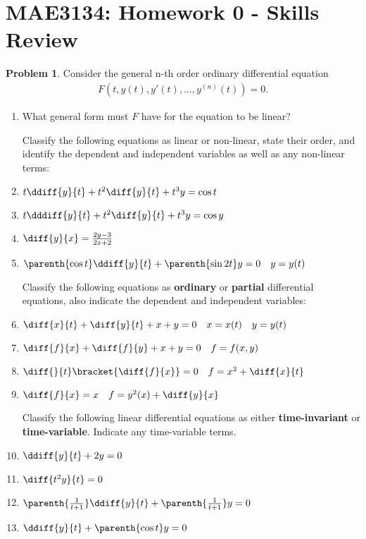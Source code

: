 \documentclass[10pt]{article}
\date{}
\theoremstyle{definition}
\newtheorem{prob}{Problem}[section]
\newenvironment{subprob}%
{\renewcommand{\theenumi}{\alph{enumi}}\renewcommand{\labelenumi}{(\theenumi)}\begin{enumerate}}%
{\end{enumerate}}%
\begin{document}
\pagestyle{empty}
\section*{MAE3134: Homework 0 - Skills Review}
\vspace*{-0.4cm}

\begin{prob}
    Consider the general n-th order ordinary differential equation
    \begin{align*}
        F(t, y(t), y'(t), \ldots, y^{(n)}(t)) = 0.
    \end{align*}

    \begin{subprob}
        \item What general form must \( F \) have for the equation to be linear?

        Classify the following equations as linear or non-linear, state their order, and identify the dependent and independent variables as well as any non-linear terms:
    \item \( t \ddiff{y}{t} + t^2 \diff{y}{t} + t^3 y = \cos t \)
    \item \( t \dddiff{y}{t} + t^2 \diff{y}{t} + t^3 y = \cos y \)
    \item \( \diff{y}{x} = \frac{2 y - 3}{2 x + 2} \) 
    \item \( \parenth{\cos t} \ddiff{y}{t} + \parenth{\sin 2 t} y = 0 \quad y = y(t)\)

        Classify the following equations as \textbf{ordinary} or \textbf{partial} differential equations, also indicate the dependent and independent variables:

    \item \( \diff{x}{t} + \diff{y}{t} + x + y = 0 \quad x=x(t) \quad y = y(t)\)
    \item \( \diff{f}{x} + \diff{f}{y} + x + y = 0 \quad f = f(x, y)\)
    \item \( \diff{}{t} \bracket{\diff{f}{x}} = 0 \quad f = x^2 + \diff{x}{t}\)
    \item \( \diff{f}{x} = x \quad f = y^2(x)  + \diff{y}{x}\)

        Classify the following linear differential equations as either \textbf{time-invariant} or \textbf{time-variable}. Indicate any time-variable terms.
    \item \( \ddiff{y}{t} + 2 y = 0\)
    \item \( \diff{t^2 y}{t} = 0 \)
    \item \( \parenth{\frac{1}{t+1}}\ddiff{y}{t} + \parenth{\frac{1}{t+1}} y = 0 \)
    \item \( \ddiff{y}{t} + \parenth{\cos{t}} y = 0 \)
    \end{subprob}

\end{prob}
\end{document}
